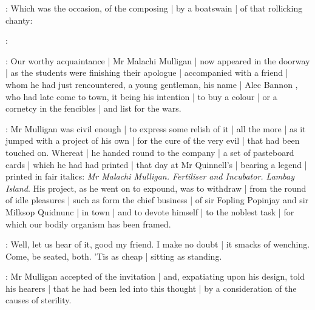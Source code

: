 \lynch:
Which was the occasion,
of the composing |
by a boatswain |
of that rollicking chanty:

\lynch:
%




:
Our worthy acquaintance |
Mr Malachi Mulligan  |
now appeared in the doorway |
as the students were finishing their apologue |
accompanied with a friend |
whom he had just rencountered,
a young gentleman,
his name |
Alec Bannon ,
who had late come to town,
it being his intention |
to buy a colour |
or a cornetcy in the fencibles |
and list for the wars.

:
Mr Mulligan was civil enough |
to express some relish of it |
all the more |
as it jumped with a project of his own |
for the cure of the very evil |
that had been touched on.
Whereat |
he handed round to the company |
a set of pasteboard cards |
which he had had printed |
that day at Mr Quinnell's |
bearing a legend |
printed in fair italics:
\emph{Mr Malachi Mulligan.
Fertiliser and Incubator.
Lambay Island}.
His project,
as he went on to expound,
was to withdraw |
from the round of idle pleasures |
such as form the chief business |
of sir Fopling Popinjay and sir Milksop Quidnunc |
in town |
and to devote himself |
to the noblest task |
for which our bodily organism has been framed.

\dixon:
Well,
let us hear of it,
good my friend.
I make no doubt |
it smacks of wenching.
Come,
be seated,
both.
'Tis as cheap |
sitting as standing.

:
Mr Mulligan accepted of the invitation |
and,
expatiating upon his design,
told his hearers |
that he had been led into this thought |
by a consideration of the causes of sterility.


